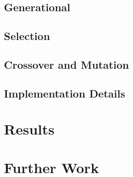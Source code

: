 \documentclass[a4paper,12pt]{article}
\begin{document}
\subsection{Generational}
\subsection{Selection}
\subsection{Crossover and Mutation}
\subsection{Implementation Details}

\section{Results}

\section{Further Work}


\end{document}
